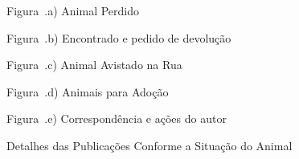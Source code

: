 \begin{figure}[H]
    \centering
    \caption{Detalhes das Publicações Conforme a Situação do Animal}
    \label{fig:tela_detalhes}
    \vspace{0.15cm}
    \begin{minipage}[t]{0.31\textwidth}
        \centering
        \par\vspace{0.12cm}
        {\small Figura~\thefigure.a) Animal Perdido}
    \end{minipage}
    \hfill
    \begin{minipage}[t]{0.31\textwidth}
        \centering
        \par\vspace{0.12cm}
        {\small Figura~\thefigure.b) Encontrado e pedido de devolução}
    \end{minipage}
    \hfill
    \begin{minipage}[t]{0.31\textwidth}
        \centering
        \par\vspace{0.12cm}
        {\small Figura~\thefigure.c) Animal Avistado na Rua}
    \end{minipage}
    \par\vspace{0.15cm}
    \begin{minipage}[t]{0.31\textwidth}
        \centering
        \par\vspace{0.12cm}
        {\small Figura~\thefigure.d) Animais para Adoção}
    \end{minipage}
    \hfill
    \begin{minipage}[t]{0.31\textwidth}
        \centering
        \par\vspace{0.12cm}
        {\small Figura~\thefigure.e) Correspondência e ações do autor}
    \end{minipage}
    \par\vspace{0.12cm}
\end{figure}

